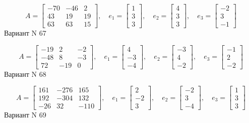 \documentclass[11pt]{report}
\begin{document}
$$A = \left[\begin{matrix}-70 & -46 & 2\\43 & 19 & 19\\63 & 63 & 15\end{matrix}\right],\quad e_1 = \left[\begin{matrix}1\\3\\3\end{matrix}\right],\quad e_2 = \left[\begin{matrix}4\\3\\3\end{matrix}\right],\quad e_3 = \left[\begin{matrix}-2\\3\\-1\end{matrix}\right]$$Вариант N 67

$$A = \left[\begin{matrix}-19 & 2 & -2\\-48 & 8 & -3\\72 & -19 & 0\end{matrix}\right],\quad e_1 = \left[\begin{matrix}4\\-3\\-4\end{matrix}\right],\quad e_2 = \left[\begin{matrix}-3\\4\\-2\end{matrix}\right],\quad e_3 = \left[\begin{matrix}-1\\2\\-2\end{matrix}\right]$$Вариант N 68

$$A = \left[\begin{matrix}161 & -276 & 165\\192 & -304 & 132\\-26 & 32 & -110\end{matrix}\right],\quad e_1 = \left[\begin{matrix}2\\-2\\3\end{matrix}\right],\quad e_2 = \left[\begin{matrix}-2\\3\\-4\end{matrix}\right],\quad e_3 = \left[\begin{matrix}1\\3\\3\end{matrix}\right]$$Вариант N 69
\end{document}
